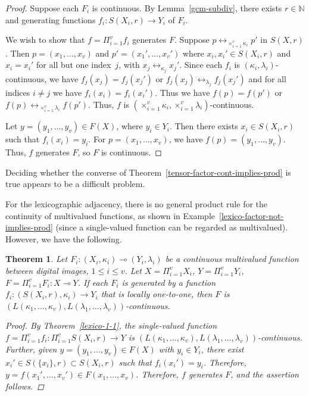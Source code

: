 \documentclass{article}
\theoremstyle{plain}
\newtheorem{thm}{Theorem}
\theoremstyle{definition}
\numberwithin{thm}{section}
\newcommand{\adj}{\leftrightarrow}
\def\N{{\mathbb N}}
\begin{document}
\begin{proof}
Suppose each $F_i$ is continuous.
By Lemma~\ref{gcm-subdiv}, there
exists $r \in \N$ and generating
functions $f_i: S(X_i,r) \to Y_i$
of $F_i$.

We wish to show that $f=\Pi_{i=1}^v f_i$ generates $F$. Suppose $p \adj_{\times_{i=1}^v \kappa_i} p'$ in $S(X,r)$. Then
$p=(x_1,\ldots,x_v)$ and
$p'=(x_1',\ldots,x_v')$ where
$x_i,x_i' \in S(X_i,r)$ and
$x_i=x_i'$ for all but one index~$j$, with $x_j \adj_{\kappa_j} x_j'$. Since each
$f_i$ is $(\kappa_i,\lambda_i)$-continuous, we have
$f_j(x_j)=f_j(x_j')$ or
$f_j(x_j)\adj_{\lambda_j} f_j(x_j')$
and for all indices $i \neq j$ we have $f_i(x_i)=f_i(x_i')$.
Thus we have
$f(p)=f(p')$ or $f(p)\adj_{\times_{i=1}^v \lambda_i} f(p')$. Thus, $f$ is
$(\times_{i=1}^v \kappa_i, \times_{i=1}^v \lambda_i)$-continuous.

Let $y=(y_1,\ldots,y_v) \in F(X)$, where $y_i \in Y_i$. Then
there exists $x_i \in S(X_i,r)$
such that $f_i(x_i)=y_i$. For
$p=(x_1,\ldots,x_v)$, we have
$f(p)=(y_1,\ldots,y_v)$. Thus,
$f$ generates $F$, so $F$ is continuous.
\end{proof}

Deciding whether the converse of
Theorem~\ref{tensor-factor-cont-implies-prod} is true appears
to be a difficult problem.

For the lexicographic adjacency,
there is no general product rule for the
continuity of multivalued functions, as shown in Example~\ref{lexico-factor-not-implies-prod} (since a single-valued function can be regarded
as multivalued). However, we have
the following.

\begin{thm}
\label{multi-prod-cont-lex}
Let $F_i: (X_i,\kappa_i) \multimap (Y_i,\lambda_i)$ be a
continuous multivalued function
between digital images, $1 \le i \le v$. Let $X=\Pi_{i=1}^v X_i$,
$Y=\Pi_{i=1}^v Y_i$,
$F=\Pi_{i=1}^v F_i: X \multimap Y$. If each $F_i$ is generated by
a function $f_i: (S(X_i,r),\kappa_i)\to Y_i$ that
is locally one-to-one, then $F$
is $(L(\kappa_1,\ldots,\kappa_v),L(\lambda_1,\dots,\lambda_v))$-continuous.

\begin{proof}
By Theorem~\ref{lexico-1-1},
the single-valued function $f=\Pi_{i=1}^v f_i: \Pi_{i=1}^v S(X_i,r) \to Y$ is
$(L(\kappa_1,\ldots,\kappa_v),L(\lambda_1,\dots,\lambda_v))$-continuous. Further,
given $y=(y_1,\ldots,y_v) \in F(X)$ with $y_i \in Y_i$, there
exist $x_i' \in S(\{x_i\},r) \subset S(X_i,r)$ such
that $f_i(x_i')=y_i$. Therefore,
$y=f(x_1',\ldots,x_v')\in F(x_1,\ldots,x_v)$. Therefore,
$f$ generates $F$, and the
assertion follows.
\end{proof}
\end{thm}
\end{document}
